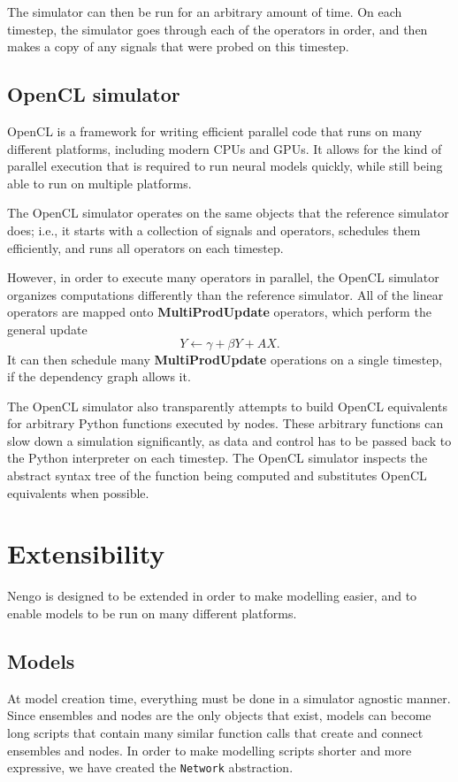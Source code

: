\documentclass{frontiersSCNS}
\begin{document}
The simulator can then be run
for an arbitrary amount of time.
On each timestep,
the simulator goes through each of the
operators in order,
and then makes a copy of any signals
that were probed on this timestep.

\subsection{OpenCL simulator}

OpenCL is a framework for writing
efficient parallel code that runs
on many different platforms,
including modern CPUs and GPUs.
It allows for the kind of parallel execution
that is required to run neural models quickly,
while still being able to run
on multiple platforms.

The OpenCL simulator operates on
the same objects that the reference simulator does;
i.e., it starts with a collection
of signals and operators,
schedules them efficiently,
and runs all operators on each timestep.

However, in order to execute
many operators in parallel,
the OpenCL simulator
organizes computations
differently than the reference simulator.
All of the linear operators are mapped
onto \textbf{MultiProdUpdate} operators,
which perform the general update
$$Y \leftarrow \gamma + \beta Y + AX.$$
It can then schedule many
\textbf{MultiProdUpdate} operations
on a single timestep,
if the dependency graph allows it.

The OpenCL simulator also transparently
attempts to build OpenCL equivalents
for arbitrary Python functions
executed by nodes.
These arbitrary functions
can slow down a simulation significantly,
as data and control has to be passed back
to the Python interpreter
on each timestep.
The OpenCL simulator inspects
the abstract syntax tree
of the function being computed
and substitutes OpenCL equivalents when possible.

\section{Extensibility}

Nengo is designed to be extended
in order to make modelling easier,
and to enable models to be run
on many different platforms.

\subsection{Models}

At model creation time,
everything must be done
in a simulator agnostic manner.
Since ensembles and nodes
are the only objects that exist,
models can become long scripts
that contain many
similar function calls that
create and connect ensembles and nodes.
In order to make modelling scripts
shorter and more expressive,
we have created the \texttt{Network} abstraction.
\end{document}
